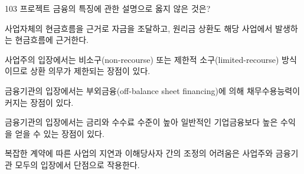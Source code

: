 \begin{question}{103}
프로젝트 금융의 특징에 관한 설명으로 옳지 않은 것은?
\begin{choices}
  \item 사업자체의 현금흐름을 근거로 자금을 조달하고, 원리금 상환도 해당 사업에서 발생하는 현금흐름에 근거한다.
  \item 사업주의 입장에서는 비소구(non-recourse) 또는 제한적 소구(limited-recourse) 방식이므로 상환 의무가 제한되는 장점이 있다.
  \item 금융기관의 입장에서는 부외금융(off-balance sheet financing)에 의해 채무수용능력이 커지는 장점이 있다.
  \item 금융기관의 입장에서는 금리와 수수료 수준이 높아 일반적인 기업금융보다 높은 수익을 얻을 수 있는 장점이 있다.
  \item 복잡한 계약에 따른 사업의 지연과 이해당사자 간의 조정의 어려움은 사업주와 금융기관 모두의 입장에서 단점으로 작용한다.
\end{choices}
\end{question}
